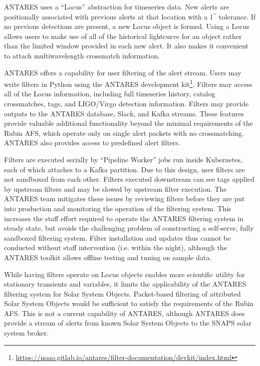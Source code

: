\documentclass[DM,authoryear,toc]{lsstdoc}
\begin{document}
ANTARES uses a ``Locus'' abstraction for timeseries data.
New alerts are positionally associated with previous alerts at that location with a 1$^{\prime\prime}$ tolerance.
If no previous detections are present, a new Locus object is formed.
Using a Locus allows users to make use of all of the historical lightcurve for an object rather than the limited window provided in each new alert.
It also makes it convenient to attach multiwavelength crossmatch information.

ANTARES offers a capability for user filtering of the alert stream.
Users may write filters in Python using the ANTARES development kit\footnote{\url{https://noao.gitlab.io/antares/filter-documentation/devkit/index.html}}. 
Filters may access all of the Locus information, including full timeseries history, catalog crossmatches, tags, and LIGO/Virgo detection information.
Filters may provide outputs to the ANTARES database, Slack, and Kafka streams.
These features provide valuable additional functionality beyond the minimal requirements of the Rubin AFS, which operate only on single alert packets with no crossmatching.
ANTARES also provides access to predefined alert filters.

Filters are executed serially by ``Pipeline Worker'' jobs run inside Kubernetes, each of which attaches to a Kafka partition.
Due to this design, user filters are not sandboxed from each other.
Filters executed downstream can see tags applied by upstream filters and may be slowed by upstream filter execution.
The ANTARES team mitigates these issues by reviewing filters before they are put into production and monitoring the operation of the filtering system.
This increases the staff effort required to operate the ANTARES filtering system in steady state, but avoids the challenging problem of constructing a self-serve, fully sandboxed filtering system.
Filter installation and updates thus cannot be conducted without staff intervention (i.e. within the night), although the ANTARES toolkit allows offline testing and tuning on sample data.

While having filters operate on Locus objects enables more scientific utility for stationary transients and variables, it limits the applicability of the ANTARES filtering system for Solar System Objects.
Packet-based filtering of attributed Solar System Objects would be sufficient to satisfy the requirements of the Rubin AFS.
This is not a current capability of ANTARES, although ANTARES does provide a stream of alerts from known Solar System Objects to the SNAPS solar system broker.
\end{document}
